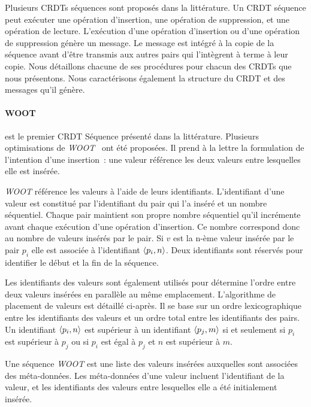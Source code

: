 Plusieurs \acp{CRDT} séquences sont proposés dans la littérature.
Un \ac{CRDT} séquence peut exécuter une opération d'insertion, une opération de suppression, et une opération de lecture.
L'exécution d'une opération d'insertion ou d'une opération de suppression génère un message.
Le message est intégré à la copie de la séquence avant d'être transmis aux autres pairs qui l'intègrent à terme à leur copie.
Nous détaillons chacune de ses procédures pour chacun des \acp{CRDT} que nous présentons.
Nous caractérisons également la structure du \ac{CRDT} et des messages qu'il génère.

\paragraph{WOOT}\autocite{oster_2006_woot} est le premier \ac{CRDT} Séquence présenté dans la littérature.
Plusieurs optimisations de \emph{WOOT}~\autocite{weiss2007wooki,ahmednacer2011evaluatingcrdts} ont été proposées.
Il prend à la lettre la formulation de l'intention d'une insertion~: une valeur référence les deux valeurs entre lesquelles elle est insérée.

\emph{WOOT} référence les valeurs à l'aide de leurs identifiants.
L'identifiant d'une valeur est constitué par l'identifiant du pair qui l'a inséré et un nombre séquentiel.
Chaque pair maintient son propre nombre séquentiel qu'il incrémente avant chaque exécution d'une opération d'insertion.
Ce nombre correspond donc au nombre de valeurs insérés par le pair.
Si $v$ est la n-ème valeur insérée par le pair $p_i$ elle est associée à l'identifiant $\tuple*{p_i, n}$.
Deux identifiants sont réservés pour identifier le début et la fin de la séquence.

Les identifiants des valeurs sont également utilisés pour détermine l'ordre entre deux valeurs insérées en parallèle au même emplacement.
L'algorithme de placement de valeurs est détaillé ci-après.
Il se base sur un ordre lexicographique entre les identifiants des valeurs et un ordre total entre les identifiants des pairs.
Un identifiant $\tuple*{p_i, n}$ est supérieur à un identifiant $\tuple*{p_j, m}$ si et seulement si $p_i$ est supérieur à $p_j$ ou si $p_i$ est égal à $p_j$ et $n$ est supérieur à $m$.

Une séquence \emph{WOOT} est une liste des valeurs insérées auxquelles sont associées des méta-données.
Les méta-données d'une valeur incluent l'identifiant de la valeur, et les identifiants des valeurs entre lesquelles elle a été initialement insérée.

